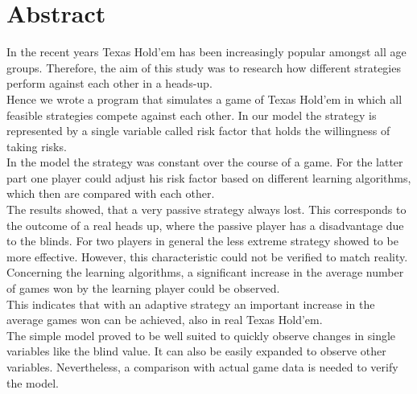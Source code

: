 \documentclass[11pt]{article}
\begin{document}



\tableofcontents

\newpage




\section{Abstract}






In the recent years Texas Hold’em has been increasingly popular amongst all age groups. Therefore, the aim of this study was to research how different strategies perform against each other in a heads-up.\\ Hence we wrote a program that simulates a game of Texas Hold’em in which all feasible strategies compete against each other. In our model the strategy is represented by a single variable called risk factor that holds the willingness of taking risks.\\ In the model the strategy was constant over the course of a game. For the latter part one player could adjust his risk factor based on different learning algorithms, which then are compared with each other.\\ The results showed, that a very passive strategy always lost. This corresponds to the outcome of a real heads up, where the passive player has a disadvantage due to the blinds. For two players in general the less extreme strategy showed to be more effective. However, this characteristic could not be verified to match reality. Concerning the learning algorithms, a significant increase in the average number of games won by the learning player could be observed.\\
This indicates that with an adaptive strategy an important increase in the average games won can be achieved, also in real Texas Hold’em.\\ The simple model proved to be well suited to quickly observe changes in single variables like the blind value. It can also be easily expanded to observe other variables. Nevertheless, a comparison with actual game data is needed to verify the model.
\end{document}
